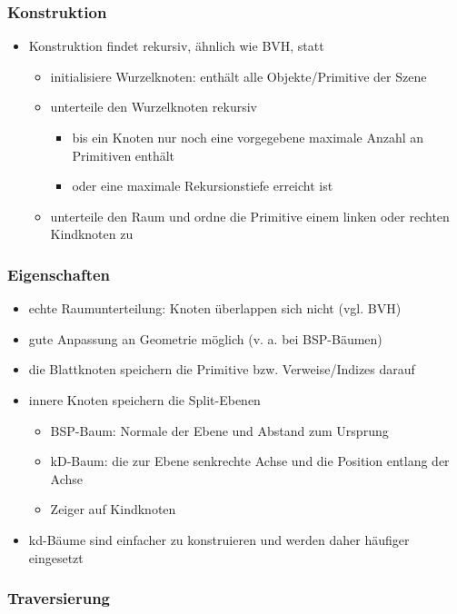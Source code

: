\documentclass[paper=a4, fontsize=11pt]{scrartcl} %
\numberwithin{equation}{section} %
\numberwithin{figure}{section} %
\numberwithin{table}{section} %
\begin{document}
\subsubsection{Konstruktion}

\begin{itemize}
\item Konstruktion findet rekursiv, ähnlich wie BVH, statt
\begin{itemize}
\item initialisiere Wurzelknoten: enthält alle Objekte/Primitive der Szene
\item unterteile den Wurzelknoten rekursiv
\begin{itemize}
\item bis ein Knoten nur noch eine vorgegebene maximale Anzahl an Primitiven enthält
\item oder eine maximale Rekursionstiefe erreicht ist
\end{itemize}
\item unterteile den Raum und ordne die Primitive einem linken oder rechten Kindknoten zu
\end{itemize}
\end{itemize}

\subsubsection{Eigenschaften}

\begin{itemize}
\item echte Raumunterteilung: Knoten überlappen sich nicht (vgl. BVH)
\item gute Anpassung an Geometrie möglich (v. a. bei BSP-Bäumen)
\item die Blattknoten speichern die Primitive bzw. Verweise/Indizes darauf
\item innere Knoten speichern die Split-Ebenen
\begin{itemize}
\item BSP-Baum: Normale der Ebene und Abstand zum Ursprung
\item kD-Baum: die zur Ebene senkrechte Achse und die Position entlang der Achse
\item Zeiger auf Kindknoten
\end{itemize}
\item kd-Bäume sind einfacher zu konstruieren und werden daher häufiger eingesetzt
\end{itemize}

\subsubsection{Traversierung}
\end{document}
